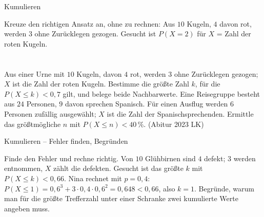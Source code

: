\setcounter{aufgabe}{8}

\begin{aufgabe}{Kumulieren}
\begin{teile}
\teil Kreuze den richtigen Ansatz an, ohne zu rechnen: Aus $10$ Kugeln, $4$ davon rot, werden $3$ ohne Zurücklegen gezogen. Gesucht ist $P(X = 2)$ für $X$ = Zahl der roten Kugeln. \\  \\  \\ 
\teil Aus einer Urne mit $10$ Kugeln, davon $4$ rot, werden $3$ ohne Zurücklegen gezogen; $X$ ist die Zahl der roten Kugeln. Bestimme die größte Zahl $k$, für die $P(X \le k) < 0{,}7$ gilt, und belege beide Nachbarwerte.
\teil Eine Reisegruppe besteht aus $24$ Personen, $9$ davon sprechen Spanisch. Für einen Ausflug werden $6$ Personen zufällig ausgewählt; $X$ ist die Zahl der Spanischsprechenden. Ermittle das größtmögliche $n$ mit $P(X \le n) < 40\,\%$. \hfill (Abitur 2023 LK)
\end{teile}
\end{aufgabe}

\begin{aufgabe}{Kumulieren – Fehler finden, Begründen}
\begin{teile}
\teil Finde den Fehler und rechne richtig. Von $10$ Glühbirnen sind $4$ defekt; $3$ werden entnommen, $X$ zählt die defekten. Gesucht ist das größte $k$ mit $P(X \le k) < 0{,}66$. Nina rechnet mit $p = 0{,}4$: $P(X \le 1) = 0{,}6^3 + 3 \cdot 0{,}4 \cdot 0{,}6^2 = 0{,}648 < 0{,}66$, also $k = 1$.
\teil Begründe, warum man für die größte Trefferzahl unter einer Schranke zwei kumulierte Werte angeben muss.
\end{teile}
\end{aufgabe}
